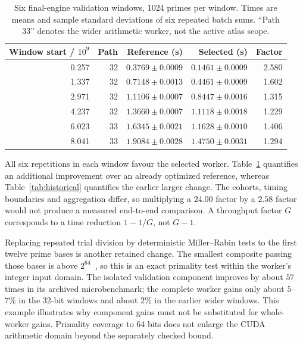 \documentclass[11pt]{article}
\theoremstyle{definition}\newtheorem{remark}[theorem]{Remark}
\begin{document}
\begin{table}[ht]
\centering\small
\begin{tabular}{rrrrr}
\toprule
Window start / $10^9$ & Path & Reference (s) & Selected (s) & Factor\\
\midrule
0.257&32&$0.3769\pm0.0009$&$0.1461\pm0.0009$&2.580\\
1.337&32&$0.7148\pm0.0013$&$0.4461\pm0.0009$&1.602\\
2.971&32&$1.1106\pm0.0007$&$0.8447\pm0.0016$&1.315\\
4.237&32&$1.3660\pm0.0007$&$1.1118\pm0.0018$&1.229\\
6.023&33&$1.6345\pm0.0021$&$1.1628\pm0.0010$&1.406\\
8.041&33&$1.9084\pm0.0028$&$1.4750\pm0.0031$&1.294\\
\bottomrule
\end{tabular}
\caption{Six final-engine validation windows, 1024 primes per window.
Times are means and sample standard deviations of six repeated batch sums.
``Path 33'' denotes the wider arithmetic worker, not the active atlas scope.}
\label{tab:throughput}
\end{table}

All six repetitions in each window favour the selected worker.
Table~\ref{tab:throughput} quantifies an additional improvement over an
already optimized reference, whereas Table~\ref{tab:historical} quantifies
the earlier larger change. The cohorts, timing boundaries and aggregation
differ, so multiplying a $24.00$ factor by a $2.58$ factor would not produce
a measured end-to-end comparison. A throughput factor $G$ corresponds to a
time reduction $1-1/G$, not $G-1$.

Replacing repeated trial division by deterministic Miller--Rabin tests to
the first twelve prime bases is another retained change. The smallest
composite passing those bases is above $2^{64}$~\cite{sorenson}, so this
is an exact primality test within the worker's integer input domain. The
isolated validation component improves by about $57$ times in its archived
microbenchmark; the complete worker gains only about $5$--$7\%$ in the
32-bit windows and about $2\%$ in the earlier wider windows. This example
illustrates why component gains must not be substituted for whole-worker
gains. Primality coverage to 64 bits does not enlarge the CUDA arithmetic
domain beyond the separately checked bound.
\end{document}
